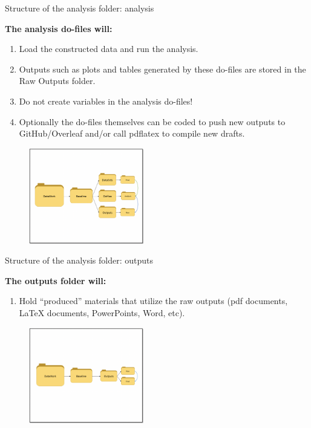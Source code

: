 \documentclass[aspectratio=169]{beamer}
\begin{document}
\begin{frame}[fragile]{Structure of the analysis folder: analysis}
\begin{multicols}{2}	
	
	\textbf{The analysis do-files will:}
	
	\begin{enumerate}
		\item<1> Load the constructed data and run the analysis.
		\item<1> Outputs such as plots and tables generated by these do-files are stored in the Raw Outputs folder. 
		\item<1> Do not create variables in the analysis do-files!
		\item<1> Optionally the do-files themselves can be coded to push new outputs to GitHub/Overleaf and/or call pdflatex to compile new drafts.
	\end{enumerate}
	
	\begin{figure}
		\centering
		\includegraphics[width=50mm]{img/Structure10}
	\end{figure}
	
\end{multicols}
\end{frame}



\begin{frame}[fragile]{Structure of the analysis folder: outputs}
\begin{multicols}{2}	
	
	\textbf{The outputs folder will:}
	
	\begin{enumerate}
		\item<1> Hold “produced” materials that utilize the raw outputs (pdf documents, LaTeX documents, PowerPoints, Word, etc).
	\end{enumerate}
	
	\begin{figure}
		\centering
		\includegraphics[width=50mm]{img/Structure11}
	\end{figure}
	
\end{multicols}
\end{frame}
\end{document}
